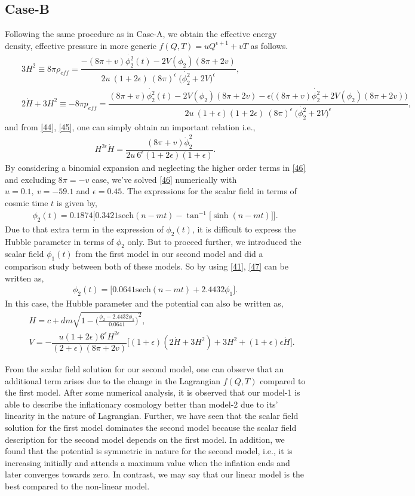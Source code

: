 \documentclass[showpacs,aps,amssymb,preprintnumbers,prd,amsmath,floatfix]{revtex4}
\def \e{\epsilon}
\def \ben{\begin{eqnarray}}
\def \een{\end{eqnarray}}
\def \r{\rho}
\begin{document}
\subsection{Case-B}
Following the same procedure as in Case-A, we obtain the effective energy density, effective pressure in more generic $f(Q,T)=u Q^{\e+1}+v T$ as follows.
\ben
&&3H^2\equiv 8\pi\r_{eff}=\dfrac{-(8\pi+v){\dot{\phi_{2}^2}}(t)-2V(\phi_2)(8\pi+2v)}{2u~(1+2\e)~(8\pi)^{\e}~\big({\dot{\phi_{2}^2}}+2V\big)^{\e}},\label{44}
\\
&&2\dot{H}+3H^2\equiv -8\pi p_{eff}=\dfrac{(8\pi+v){\dot{\phi_{2}^2}}(t)-2V(\phi_2)(8\pi+2v)-\e\big((8\pi+v){\dot{\phi_{2}^2}}+2V(\phi_2)(8\pi+2v)\big)}{2u~(1+\e)(1+2\e)~(8\pi)^{\e}~\big({\dot{\phi_{2}^2}}+2V\big)^{\e}},\label{45}
\een
and from \eqref{44}, \eqref{45}, one can simply obtain an important relation i.e.,
\ben
H^{2\e}\dot{H}=\dfrac{(8\pi+v){\dot{\phi}}^2_{2}}{2u~6^{\e}(1+2\e)(1+\e)}.\label{46}
\een
By considering a binomial expansion and neglecting the higher order terms in \eqref{46} and excluding $8\pi=-v$ case, we've solved \eqref{46} numerically with $u=0.1,~v=-59.1$ and $\e=0.45$. The expressions for the scalar field in terms of cosmic time $t$ is given by,
\ben
\phi_{2}(t)=0.1874\Big[0.3421\text{sech}(n-mt)-\tan^{-1}\big[\sinh(n-mt)\big]\Big].\label{47}
\een
Due to that extra term in the expression of $\phi_{2}(t)$, it is difficult to express the Hubble parameter in terms of $\phi_{2}$ only. But to proceed further, we introduced the scalar field $\phi_{1}(t)$ from the first model in our second model and did a comparison study between both of these models. So by using \eqref{41}, \eqref{47} can be written as,
\ben
\phi_{2}(t)=\Big[0.0641\text{sech}(n-mt)+ 2.4432 \phi_{1}\Big].\label{48}
\een
In this case, the Hubble parameter and the potential can also be written as,
\ben
&&H=c+dm\sqrt{1-{\Big(\frac{\phi_{2}-2.4432\phi_{1}}{0.0641}\Big)}^2},\label{49}
\\
&&V=-\dfrac{u(1+2\e)6^{\e}H^{2\e}}{(2+\e)(8\pi+2v)}\Big[(1+\e)(2\dot{H}+3H^2)+3H^2+(1+\e)\e\dot{H}\Big].\label{50}
\een

From the scalar field solution for our second model, one can observe that an additional term arises due to the change in the Lagrangian $f(Q,T)$ compared to the first model.  After some numerical analysis, it is observed that our model-1 is able to describe the inflationary cosmology better than model-2 due to its' linearity in the nature of Lagrangian. Further, we have seen that the scalar field solution for the first model dominates the second model because the scalar field description for the second model depends on the first model. In addition, we found that the potential is symmetric in nature for the second model, i.e., it is increasing initially and attends a maximum value when the inflation ends and later converges towards zero. In contrast, we may say that our linear model is the best compared to the non-linear model. 
\end{document}
